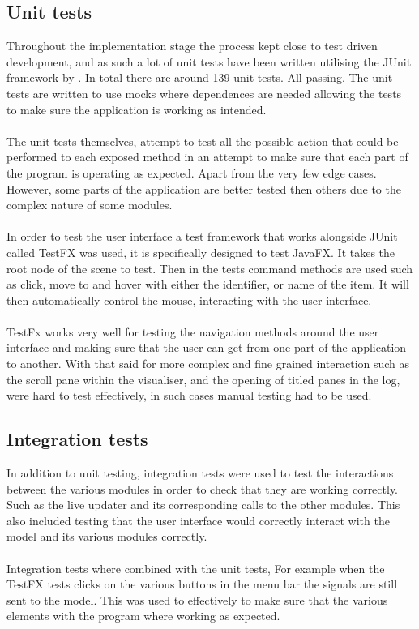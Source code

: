 \subsection{Unit tests}
\label{subsec:unit_tests}

Throughout the implementation stage the process kept close to test driven development, and as such a  lot of unit tests have been written utilising the JUnit framework by \cite{junit} . In total there are around 139 unit tests. All passing. The unit tests are written to use mocks where dependences are needed allowing the tests to make sure the application is working as intended.
\\\\
The unit tests themselves, attempt to test all the possible action that could be performed to each exposed method in an attempt to make sure that each part of the program is operating as expected. Apart from the very few edge cases. However, some parts of the application are better tested then others due to the complex nature of some modules.
\\\\
In order to test the user interface a test framework that works alongside JUnit called TestFX \citep{test_fx} was used, it is specifically designed to test JavaFX. It takes the root node of the scene to test. Then in the tests command methods are used such as click, move to and hover with either the identifier, or name of the item. It will then automatically control the mouse, interacting with the user interface.
\\\\
TestFx works very well for testing the navigation methods around the user interface and making sure that the user can get from one part of the application to another. With that said for more complex and fine grained interaction such as the scroll pane within the visualiser, and the opening of titled panes in the log, were hard to test effectively, in such cases manual testing had to be used.

\subsection{Integration tests}
\label{subsec:integration_tests}

In addition to unit testing, integration tests were used to test the interactions between the various modules in order to check that they are working correctly. Such as the live updater and its corresponding calls to the other modules. This also included testing that the user interface would correctly interact with the model and its various modules correctly.
\\\\
Integration tests where combined with the unit tests, For example when the TestFX tests clicks on the various buttons in the menu bar the signals are still sent to the model. This  was used to effectively to make sure that the various elements with the program where working as expected.

